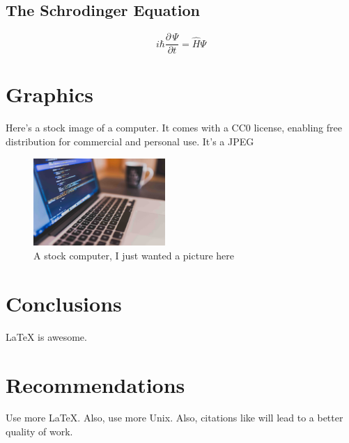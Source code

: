 \documentclass{workreport}
\begin{document}
\begin{body}
\subsection{The Schrodinger Equation}

	\begin{equation}
		i\hbar \frac{\partial \, \Psi}{\partial t} = \hat{H}\Psi
	\end{equation}

\section{Graphics}
	Here's a stock image of a computer. It comes with a CC0 license, enabling
	free distribution for commercial and personal use. It's a JPEG

	\begin{figure}[!ht]
		\centering
		\label{fig:stock_computer}
		\includegraphics[width=5cm]{./stock-image.jpg}
		\caption{A stock computer, I just wanted a picture here}
	\end{figure}

\section{Conclusions}
	\gls{LaTeX} is awesome.

\section{Recommendations}

	Use more \LaTeX. Also, use more \gls{Unix}. Also, citations like
	\cite{schweiger_principles_2001} will lead to a better quality of work.

\end{body}


\end{document}
